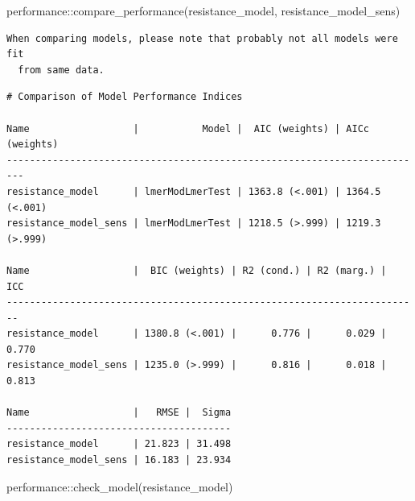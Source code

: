\documentclass[
  letterpaper,
  DIV=11,
  numbers=noendperiod]{scrartcl}
\newenvironment{Shaded}{\begin{snugshade}}{\end{snugshade}}
\newcommand{\FunctionTok}[1]{\textcolor[rgb]{0.28,0.35,0.67}{#1}}
\newcommand{\NormalTok}[1]{\textcolor[rgb]{0.00,0.23,0.31}{#1}}
\newcommand{\SpecialCharTok}[1]{\textcolor[rgb]{0.37,0.37,0.37}{#1}}
\begin{document}
\begin{Shaded}
\begin{Highlighting}[]
\NormalTok{performance}\SpecialCharTok{::}\FunctionTok{compare\_performance}\NormalTok{(resistance\_model, resistance\_model\_sens)}
\end{Highlighting}
\end{Shaded}

\begin{verbatim}
When comparing models, please note that probably not all models were fit
  from same data.
\end{verbatim}

\begin{verbatim}
# Comparison of Model Performance Indices

Name                  |           Model |  AIC (weights) | AICc (weights)
-------------------------------------------------------------------------
resistance_model      | lmerModLmerTest | 1363.8 (<.001) | 1364.5 (<.001)
resistance_model_sens | lmerModLmerTest | 1218.5 (>.999) | 1219.3 (>.999)

Name                  |  BIC (weights) | R2 (cond.) | R2 (marg.) |   ICC
------------------------------------------------------------------------
resistance_model      | 1380.8 (<.001) |      0.776 |      0.029 | 0.770
resistance_model_sens | 1235.0 (>.999) |      0.816 |      0.018 | 0.813

Name                  |   RMSE |  Sigma
---------------------------------------
resistance_model      | 21.823 | 31.498
resistance_model_sens | 16.183 | 23.934
\end{verbatim}

\begin{Shaded}
\begin{Highlighting}[]
\NormalTok{performance}\SpecialCharTok{::}\FunctionTok{check\_model}\NormalTok{(resistance\_model)}
\end{Highlighting}
\end{Shaded}
\end{document}

